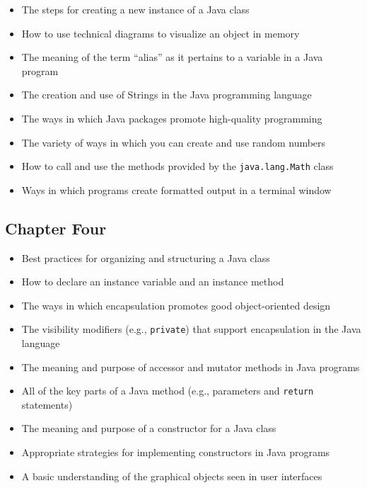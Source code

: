 \documentclass[11pt]{article}
\begin{document}
\begin{itemize}

  \item The steps for creating a new instance of a Java class
  \item How to use technical diagrams to visualize an object in memory
  \item The meaning of the term ``alias'' as it pertains to a variable in a Java program
  \item The creation and use of Strings in the Java programming language
  \item The ways in which Java packages promote high-quality programming
  \item The variety of ways in which you can create and use random numbers
  \item How to call and use the methods provided by the {\tt java.lang.Math} class
  \item Ways in which programs create formatted output in a terminal window

\end{itemize}

\subsection*{Chapter Four}

\begin{itemize}

  \item Best practices for organizing and structuring a Java class
  \item How to declare an instance variable and an instance method
  \item The ways in which encapsulation promotes good object-oriented design
  \item The visibility modifiers (e.g., {\tt private}) that support encapsulation in the Java language
  \item The meaning and purpose of accessor and mutator methods in Java programs
  \item All of the key parts of a Java method (e.g., parameters and {\tt return} statements)
  \item The meaning and purpose of a constructor for a Java class
  \item Appropriate strategies for implementing constructors in Java programs
  \item A basic understanding of the graphical objects seen in user interfaces

\end{itemize}
\end{document}
